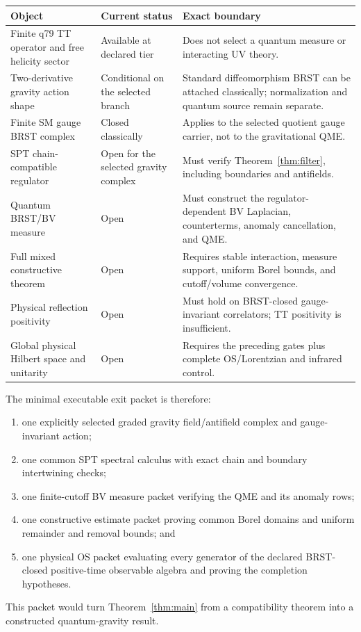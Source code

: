 \documentclass[11pt]{article}
\begin{document}
\begin{center}
\small
\begin{tabular}{p{}p{}p{}}
\hline
Object & Current status & Exact boundary \\
\hline
Finite q79 TT operator and free helicity sector & Available at declared tier & Does not select a quantum measure or interacting UV theory. \\
Two-derivative gravity action shape & Conditional on the selected branch & Standard diffeomorphism BRST can be attached classically; normalization and quantum source remain separate. \\
Finite SM gauge BRST complex & Closed classically & Applies to the selected quotient gauge carrier, not to the gravitational QME. \\
SPT chain-compatible regulator & Open for the selected gravity complex & Must verify Theorem~\ref{thm:filter}, including boundaries and antifields. \\
Quantum BRST/BV measure & Open & Must construct the regulator-dependent BV Laplacian, counterterms, anomaly cancellation, and QME. \\
Full mixed constructive theorem & Open & Requires stable interaction, measure support, uniform Borel bounds, and cutoff/volume convergence. \\
Physical reflection positivity & Open & Must hold on BRST-closed gauge-invariant correlators; TT positivity is insufficient. \\
Global physical Hilbert space and unitarity & Open & Requires the preceding gates plus complete OS/Lorentzian and infrared control. \\
\hline
\end{tabular}
\normalsize
\end{center}

The minimal executable exit packet is therefore:
\begin{enumerate}[label=\textup{E\arabic*.}]
\item one explicitly selected graded gravity field/antifield complex and
gauge-invariant action;
\item one common SPT spectral calculus with exact chain and boundary
intertwining checks;
\item one finite-cutoff BV measure packet verifying the QME and its anomaly
rows;
\item one constructive estimate packet proving common Borel domains and
uniform remainder and removal bounds; and
\item one physical OS packet evaluating every generator of the declared
BRST-closed positive-time observable algebra and proving the completion
hypotheses.
\end{enumerate}
This packet would turn Theorem~\ref{thm:main} from a compatibility theorem into
a constructed quantum-gravity result.
\end{document}
